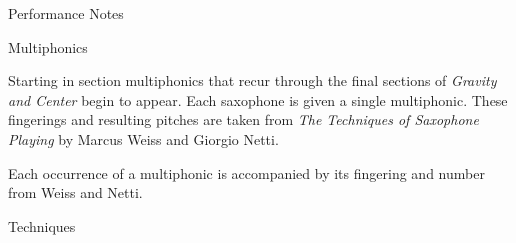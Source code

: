 \documentclass{article}
\begin{document}
\begin{center}
  {\Huge Performance Notes}
\end{center}

{\Large Multiphonics}

Starting in section\hspace{-.5em}{%
\parindent 0pt
\noindent
\ifx\preLilyPondExample \undefined
\else
  \expandafter\preLilyPondExample
\fi
\def\lilypondbook{}%
%
\ifx\postLilyPondExample \undefined
\else
  \expandafter\postLilyPondExample
\fi
} multiphonics that recur
through the final sections of \textit{Gravity and Center} begin to appear. Each saxophone is given
a single multiphonic. These fingerings and resulting pitches are taken from \textit{The Techniques of
Saxophone Playing} by Marcus Weiss and Giorgio Netti.

Each occurrence of a multiphonic is accompanied by its fingering and number from Weiss and Netti.

{%
\parindent 0pt
\noindent
\ifx\preLilyPondExample \undefined
\else
  \expandafter\preLilyPondExample
\fi
\def\lilypondbook{}%
%
\ifx\postLilyPondExample \undefined
\else
  \expandafter\postLilyPondExample
\fi
}

{\Large Techniques}
\end{document}

